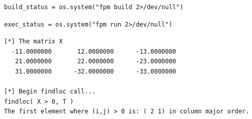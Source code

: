 \begin{verbatim}
build_status = os.system("fpm build 2>/dev/null")
\end{verbatim}

\begin{verbatim}
exec_status = os.system("fpm run 2>/dev/null")
\end{verbatim}

\begin{verbatim}
[*] The matrix X
  -11.0000000       12.0000000      -13.0000000    
   21.0000000       22.0000000      -23.0000000    
   31.0000000      -32.0000000      -33.0000000    

[*] Begin findloc call...
findloc( X > 0, T )
The first element where (i,j) > 0 is: ( 2 1) in column major order.
\end{verbatim}